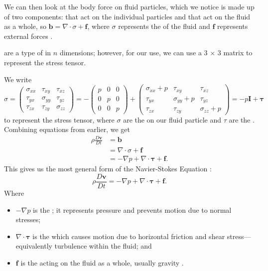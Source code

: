 \documentclass[12pt]{article}
\renewcommand{\vec}[1]{\mathbf{#1}}
\begin{document}
    We can then look at the body force on fluid particles, which we notice is made up of two components:  that act on the individual particles and  that act on the fluid as a whole, so $\vec{b}=\nabla \cdot \sigma +\vec{f}$, where $\sigma$ represents the  of the fluid and $ \vec{f}$ represents external forces \cite{derivation}.
    \begin{abuse}[Tensors]
         are a type of  in $n$ dimensions; however, for our use, we can use a 3 $\times$ 3 matrix to represent the stress tensor.
    \end{abuse}
    We write
    \[ \sigma = \begin{pmatrix} \sigma_{x x} & \tau_{xy} & \tau_{xz} \\ \tau_{yx} & \sigma_{yy} & \tau_{yz} \\ \tau_{zx} & \tau_{zy} & \sigma_{zz} \end{pmatrix} = -\begin{pmatrix} p & 0 & 0 \\ 0 & p & 0 \\ 0 & 0 & p \end{pmatrix} + \begin{pmatrix} \sigma_{x x}+p & \tau_{xy} & \tau_{xz} \\ \tau_{yx} & \sigma_{yy}+p & \tau_{yz} \\ \tau_{zx} & \tau_{zy} & \sigma_{zz}+p \end{pmatrix} = -p\vec{I}+\vec{\tau} \] 
    to represent the stress tensor, where $\sigma$ are the  on our fluid particle and $\tau$ are the . \\
    Combining equations from earlier, we get
    \begin{align*}
        \rho \frac{D\vec{v}}{Dt} &=\vec{b} \\
                                 &= \nabla \cdot \sigma+\vec{f} \\
                                 &= -\nabla p+\nabla \cdot\vec{\tau}+\vec{f}
    .\end{align*}
    This gives us the most general form of the Navier-Stokes Equation \cite{wikiderivation}:
    \[ \rho \frac{D\vec{v}}{Dt}=-\nabla p+\nabla \cdot \vec{\tau}+\vec{f}. \] 
    Where
    \begin{itemize}
        \item $-\nabla p$ is the ; it represents pressure and prevents motion due to normal stresses;
        \item $\nabla \cdot \vec{\tau}$ is the  which causes motion due to horizontal friction and shear stress---equivalently turbulence within the fluid; and
        \item $\vec{f}$ is the  acting on the fluid as a whole, usually gravity \cite{derivation}.
    \end{itemize}
\end{document}
